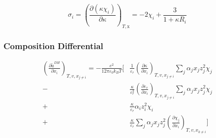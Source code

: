 \documentclass[12pt, letterpaper]{article}
\begin{document}

\begin{equation}
    \sigma_{i}=\left(\frac{\partial(\kappa\chi_{i})}{\partial\kappa}\right)_{T,\mathrm{x}}=-2\chi_{i}+\frac{3}{1+\kappa R_{i}}
    \label{eq:sigma_dh_bjerrum}
\end{equation}

\subsubsection{Composition Differential}


\begin{equation}
    \begin{aligned}
        \left(\frac{\partial \tilde{a}^{DH}}{\partial x_{i}}\right)_{T,v,x_{j\neq i}}
        =
        -\frac{e^{2}}{12\pi\varepsilon_{0}k_{B}T}
        \Bigg[
          & \frac{1}{\varepsilon_{r}}\left(\frac{\partial\kappa}{\partial x_{i}}\right)_{T,v,x_{j\neq i}}
            \sum_{j}\alpha_{j}x_{j}z_{j}^{2}\chi_{j}
        \\
        - & \frac{\kappa}{\varepsilon_{r}^{2}}
            \left(\frac{\partial\varepsilon_{r}}{\partial x_{i}}\right)_{T,v,x_{j\neq i}}
            \sum_{j}\alpha_{j}x_{j}z_{j}^{2}\chi_{j}
        \\
        + & \frac{\kappa}{\varepsilon_{r}}\alpha_{i}z_{i}^{2}\chi_{i}
        \\
        + & \frac{\kappa}{\varepsilon_{r}}
            \sum_{j}\alpha_{j}x_{j}z_{j}^{2}
            \left(\frac{\partial\chi_{j}}{\partial x_{i}}\right)_{T,v,x_{k\neq i}}
            \Bigg]
    \end{aligned}
    \label{eq:dares_dh_dxi_bjerrum}
\end{equation}

\end{document}
